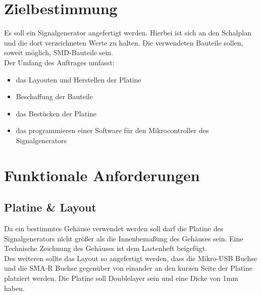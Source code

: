 \documentclass[a4paper,12pt]{article}
\title{\projekt}
\author{\authorName}
\begin{document}
 \maketitle
 \setcounter{page}{2}
 \tableofcontents          %
 \clearpage
 
\section{Zielbestimmung}
Es soll ein Signalgenerator angefertigt werden. Hierbei ist sich an den Schalplan und die dort verzeichneten Werte zu halten.
Die verwendeten Bauteile sollen, soweit möglich, SMD-Bauteile sein.\\
Der Umfang des Auftrages umfasst:
\begin{itemize}
\item{das Layouten und Herstellen der Platine}
\item{Beschaffung der Bauteile}
\item{das Bestücken der Platine}
\item{das programmieren einer Software für den Mikrocontroller des Signalgenerators}
\end{itemize}



\section{Funktionale Anforderungen}

\subsection{Platine \& Layout}

Da ein bestimmtes Gehäuse verwendet werden soll darf die Platine des Signalgenerators nicht größer als
die Innenbemaßung des Gehäuses sein. Eine Technische Zeichnung des Gehäuses ist dem Lastenheft beigefügt.\\
Des weiteren sollte das Layout so angefertigt werden, dass die Mikro-USB Buchse und die SMA-R Buchse gegenüber
von einander an den kurzen Seite der Platine platziert werden.
Die Platine soll Doublelayer sein und eine Dicke von 1mm haben.
\end{document}
